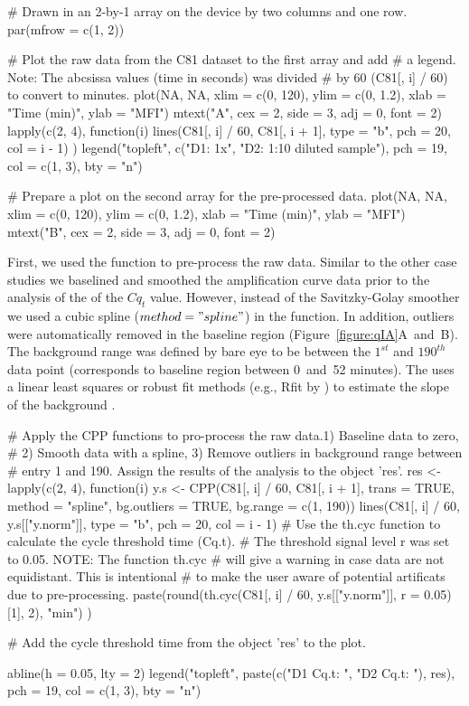 \begin{example}
# Drawn in an 2-by-1 array on the device by two columns and one row.
par(mfrow = c(1, 2))

# Plot the raw data from the C81 dataset to the first array and add
# a legend. Note: The abcsissa values (time in seconds) was divided 
# by 60 (C81[, i] / 60) to convert to minutes.
plot(NA, NA, xlim = c(0, 120), ylim = c(0, 1.2), xlab = "Time (min)", ylab = "MFI")
mtext("A", cex = 2, side = 3, adj = 0, font = 2)
lapply(c(2, 4), function(i) {
  lines(C81[, i] / 60, C81[, i + 1], type = "b", pch = 20, col = i - 1)
})
legend("topleft", c("D1: 1x", "D2: 1:10 diluted sample"), pch = 19, col = c(1, 3), 
       bty = "n")

# Prepare a plot on the second array for the pre-processed data.
plot(NA, NA, xlim = c(0, 120), ylim = c(0, 1.2), xlab = "Time (min)", ylab = "MFI")
mtext("B", cex = 2, side = 3, adj = 0, font = 2)
\end{example}

First, we used the  function to pre-process the raw data. Similar to 
the other case studies we baselined and smoothed the amplification curve data 
prior to the analysis of the of the $Cq_{t}$ value. However, instead of the 
Savitzky-Golay smoother we used a cubic spline ($method = "spline"$) in the 
 function. In addition, outliers were automatically removed in the 
baseline region (Figure~\ref{figure:qIA}A~and~B). The background range was 
defined by bare eye to be between the $1^{st}$ and $190^{th}$ data point 
(corresponds to baseline region between 0~and~52 minutes). The  uses a 
linear least squares or robust fit methods (e.g., Rfit by \citet{Kloke_2012}) to 
estimate the slope of the background \citep{roediger_2015_Bioinformatics}.

\begin{example}
# Apply the CPP functions to pro-process the raw data.1) Baseline data to zero, 
# 2) Smooth data with a spline, 3) Remove outliers in background range between 
# entry 1 and 190. Assign the results of the analysis to the object 'res'.
res <- lapply(c(2, 4), function(i) {
  y.s <- CPP(C81[, i] / 60, C81[, i + 1],
             trans = TRUE, 
             method = "spline",
             bg.outliers = TRUE,
             bg.range = c(1, 190))
  lines(C81[, i] / 60, y.s[["y.norm"]], type = "b", pch = 20, col = i - 1)
  # Use the th.cyc function to calculate the cycle threshold time (Cq.t). 
  # The threshold signal level r was set to 0.05. NOTE: The function th.cyc
  # will give a warning in case data are not equidistant. This is intentional
  # to make the user aware of potential artificats due to pre-processing.
  paste(round(th.cyc(C81[, i] / 60, y.s[["y.norm"]], r = 0.05)[1], 2), "min")
})

# Add the cycle threshold time from the object 'res' to the plot.

abline(h = 0.05, lty = 2)
legend("topleft", paste(c("D1 Cq.t: ", "D2 Cq.t: "), res), pch = 19, 
       col = c(1, 3), bty = "n")
\end{example}

